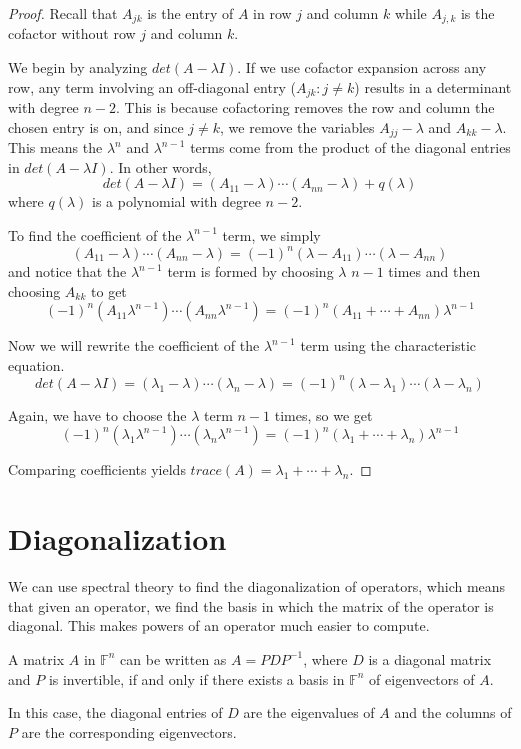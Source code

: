 \begin{proof}
Recall that $A_{jk}$ is the entry of $A$ in row $j$ and column $k$ while $A_{j, k}$ is the cofactor without row $j$ and column $k$. 

We begin by analyzing $det(A - \lambda I)$. If we use cofactor expansion across any row, any term involving an off-diagonal entry ($A_{jk} : j \neq k$) results in a determinant with degree $n - 2$. This is because cofactoring removes the row and column the chosen entry is on, and since $j \neq k$, we remove the variables $A_{jj} - \lambda$ and $A_{kk} - \lambda$. This means the $\lambda^{n}$ and $\lambda^{n-1}$ terms come from the product of the diagonal entries in $det(A - \lambda I)$. In other  words, 
$$det(A - \lambda I) = (A_{11} - \lambda) \cdots (A_{nn} - \lambda) + q(\lambda)$$
where $q(\lambda)$ is a polynomial with degree $n - 2$. 

To find the coefficient of the $\lambda^{n-1}$ term, we simply 
$$ (A_{11} - \lambda) \cdots (A_{nn} - \lambda) = (-1)^{n} (\lambda - A_{11}) \cdots (\lambda - A_{nn})$$
and notice that the $\lambda^{n-1}$ term is formed by choosing $\lambda$ $n - 1$ times and then choosing $A_{kk}$ to get 
$$ (-1)^{n} (A_{11} \lambda^{n-1}) \cdots (A_{nn} \lambda^{n-1}) = (-1)^{n} (A_{11} + \cdots + A_{nn}) \lambda^{n-1}$$

Now we will rewrite the coefficient of the $\lambda^{n-1}$ term using the characteristic equation. 
$$det(A - \lambda I) = (\lambda_{1} - \lambda) \cdots (\lambda_{n} - \lambda) = (-1)^{n} (\lambda - \lambda_{1}) \cdots (\lambda - \lambda_{n})$$

Again, we have to choose the $\lambda$ term $n - 1$ times, so we get 
$$(-1)^{n} (\lambda_{1} \lambda^{n-1}) \cdots (\lambda_{n} \lambda^{n-1}) = (-1)^{n} (\lambda_{1} + \cdots + \lambda_{n})\lambda^{n-1}$$

Comparing coefficients yields $trace(A) = \lambda_{1} + \cdots + \lambda_{n}$. 
\end{proof}

\section{Diagonalization}
We can use spectral theory to find the diagonalization of operators, which means that given an operator, we find the basis in which the matrix of the operator is diagonal. This makes powers of an operator much easier to compute. 

\begin{theorem}
A matrix $A$ in $\mathbb{F}^{n}$ can be written as $A = PDP^{-1}$, where $D$ is a diagonal matrix and $P$ is invertible, if and only if there exists a basis in $\mathbb{F}^{n}$ of eigenvectors of $A$. 

In this case, the diagonal entries of $D$ are the eigenvalues of $A$ and the columns of $P$ are the corresponding eigenvectors. 
\end{theorem}

